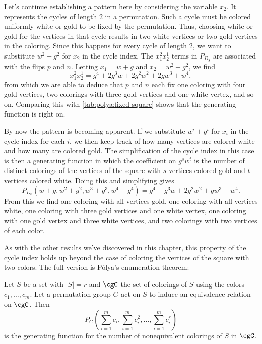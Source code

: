 Let's continue establishing a pattern here by considering the variable
$x_2$. It represents the cycles of length $2$ in a permutation. Such a
cycle must be colored uniformly white or gold to be fixed by the
permutation. Thus, choosing white or gold for the vertices in that
cycle results in two white vertices or two gold vertices in the
coloring. Since this happens for every cycle of length $2$, we want to
substitute $w^2+g^2$ for $x_2$ in the cycle index. The $x_1^2x_2^1$
terms in $P_{D_8}$ are associated with the flips $p$ and $n$. Letting
$x_1=w+g$ and $x_2 = w^2+g^2$, we find
\[x_1^2x_2^1 = g^4+2 g^3 w+2 g^2 w^2+2 g w^3+w^4,\]
from which we are able to deduce that $p$ and $n$ each fix one
coloring with four gold vertices, two colorings with three gold
vertices and one white vertex, and so on. Comparing this with
\autoref{tab:polya:fixed-square} shows that the generating function is
right on.

By now the pattern is becoming apparent. If we substitute $w^i+g^i$
for $x_i$ in the cycle index for each $i$, we then keep track of how
many vertices are colored white and how many are colored gold. The
simplification of the cycle index in this case is then a generating
function in which the coefficient on $g^s w^t$ is the number of
distinct colorings of the vertices of the square with $s$ vertices
colored gold and $t$ vertices colored white. Doing this and
simplifying gives
\[P_{D_8}(w+g,w^2+g^2,w^3+g^3,w^4+g^4) = g^4+g^3 w+2 g^2 w^2+g
w^3+w^4.\]
From this we find one coloring with all vertices gold,
one coloring with all vertices white, one coloring with three gold
vertices and one white vertex, one coloring with one gold vertex and
three white vertices, and two colorings with two vertices of each
color.

As with the other results we've discovered in this chapter, this
property of the cycle index holds up beyond the case of coloring the
vertices of the square with two colors. The full version is P\'olya's
enumeration theorem:

\begin{theorem}\label{theorem:polya:polya}
  Let $S$ be a set with $|S|=r$ and $\cgC$ the set of colorings of $S$
  using the colors $c_1,\dots,c_m$. Let a permutation group $G$ act on
  $S$ to induce an equivalence relation on $\cgC$. Then
  \[P_G\left(\sum_{i=1}^m c_i, \sum_{i=1}^m c_i^2, \dots,\sum_{i=1}^m
    c_i^r\right) \]
  is the generating function for the number of nonequivalent colorings
  of $S$ in $\cgC$.
\end{theorem}

